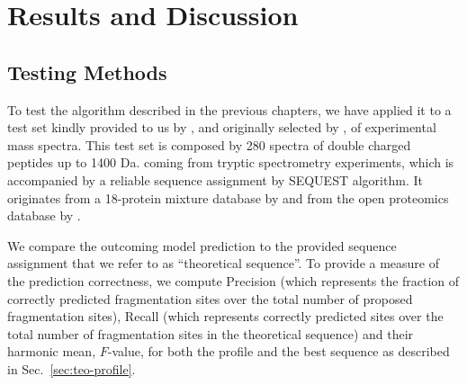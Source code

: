 \chapter{Results and Discussion}
\label{chap:msms-results}


\section{Testing Methods}

To test the algorithm described in the previous chapters, we have applied it to a
test set kindly provided to us by \citet{fischer2005novohmm}, and originally
selected by \citet{pepnovo-analchem-2005}, of experimental mass spectra.
This test set is composed by 280 spectra of double charged peptides up to 1400 Da. coming from
tryptic spectrometry
experiments, which is accompanied by a reliable sequence assignment by SEQUEST
algorithm\cite{pepnovo-analchem-2005}. 
It originates from a 18-protein mixture database by \citet{keller2002experimental}
and from the open proteomics database by \citet{prince-2004-prot-repository}.

We compare the outcoming model prediction to the provided sequence assignment
that we refer to as ``theoretical sequence''.
To provide a measure of the prediction correctness, we compute Precision (which represents the fraction
of correctly predicted fragmentation sites over the total number of proposed
fragmentation sites),
Recall (which represents correctly predicted sites over the total number of
fragmentation sites in the theoretical sequence) and their harmonic mean,
$F$-value, for both the profile and the best sequence
as described in Sec.~\ref{sec:teo-profile}.


